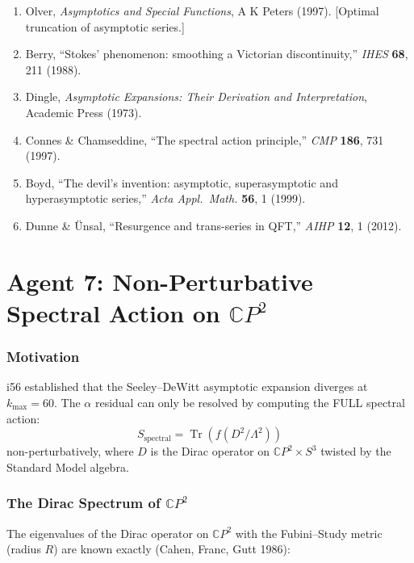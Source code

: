 \documentclass[11pt,a4paper]{article}
\newcommand{\Tr}{\operatorname{Tr}}
\newcommand{\CP}{\mathbb{C}P}
\begin{document}
\begin{enumerate}
\item Olver, \textit{Asymptotics and Special Functions}, A K Peters (1997). [Optimal truncation of asymptotic series.]
\item Berry, ``Stokes' phenomenon: smoothing a Victorian discontinuity,'' \textit{IHES} \textbf{68}, 211 (1988).
\item Dingle, \textit{Asymptotic Expansions: Their Derivation and Interpretation}, Academic Press (1973).
\item Connes \& Chamseddine, ``The spectral action principle,'' \textit{CMP} \textbf{186}, 731 (1997).
\item Boyd, ``The devil's invention: asymptotic, superasymptotic and hyperasymptotic series,'' \textit{Acta Appl.\ Math.} \textbf{56}, 1 (1999).
\item Dunne \& \"Unsal, ``Resurgence and trans-series in QFT,'' \textit{AIHP} \textbf{12}, 1 (2012).
\end{enumerate}


\part{Agent 7: Non-Perturbative Spectral Action on $\CP^2$}
\label{part:nonpert}

\section{Motivation}

i56 established that the Seeley--DeWitt asymptotic expansion diverges at $k_{\max} = 60$. The $\alpha$ residual can only be resolved by computing the FULL spectral action:
\begin{equation}
S_{\mathrm{spectral}} = \Tr(f(D^2/\Lambda^2))
\end{equation}
non-perturbatively, where $D$ is the Dirac operator on $\CP^2 \times S^3$ twisted by the Standard Model algebra.

\section{The Dirac Spectrum of $\CP^2$}

The eigenvalues of the Dirac operator on $\CP^2$ with the Fubini--Study metric (radius $R$) are known exactly (Cahen, Franc, Gutt 1986):
\end{document}
